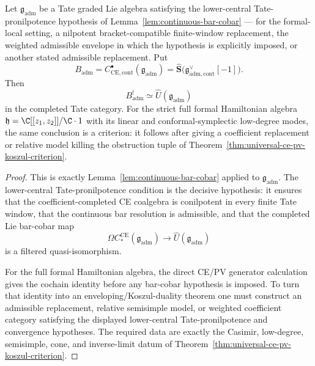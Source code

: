 \documentclass[11pt]{memoir}
\begin{document}
\begin{prop}\label{prop:ce-koszul}
  Let \(\mathfrak g_{\mathrm{adm}}\) be a Tate graded Lie algebra satisfying
  the lower-central Tate-pronilpotence hypothesis of
  Lemma~\ref{lem:continuous-bar-cobar} ---
  for the formal-local setting, a nilpotent
  bracket-compatible finite-window replacement,
  the weighted admissible envelope in which the hypothesis is explicitly
  imposed, or another stated admissible replacement.  Put
  \[
    B_{\mathrm{adm}}
      =C^\bullet_{\mathrm{CE},\mathrm{cont}}(\mathfrak g_{\mathrm{adm}})
      =\widehat{\mathbf S}
       \bigl(\mathfrak g_{\mathrm{adm},\mathrm{cont}}^\vee[-1]\bigr).
  \]
  Then
  \[
    B_{\mathrm{adm}}^!\simeq
    \widehat U(\mathfrak g_{\mathrm{adm}})
  \]
  in the completed Tate category.  For the strict full formal Hamiltonian
  algebra \(\mathfrak h=\C[[z_1,z_2]]/\C\cdot1\) with its linear and
  conformal-symplectic low-degree modes, the same conclusion is a
  criterion: it follows after giving a coefficient replacement or
  relative model killing the obstruction tuple of
  Theorem~\ref{thm:universal-ce-pv-koszul-criterion}.
\end{prop}

\begin{proof}
  This is exactly Lemma~\ref{lem:continuous-bar-cobar} applied to
  \(\mathfrak g_{\mathrm{adm}}\).  The lower-central
  Tate-pronilpotence condition is the decisive hypothesis: it ensures that the coefficient-completed
  CE coalgebra is conilpotent in every finite Tate window, that the
  continuous bar resolution is admissible, and that the completed
  Lie bar-cobar map
  \[
    \Omega C_*^{\mathrm{CE}}(\mathfrak g_{\mathrm{adm}})
      \longrightarrow
    \widehat U(\mathfrak g_{\mathrm{adm}})
  \]
  is a filtered quasi-isomorphism.

  For the full formal Hamiltonian algebra, the direct CE/PV generator
  calculation gives the cochain identity before any bar-cobar hypothesis
  is imposed.  To turn that identity into an enveloping/Koszul-duality
  theorem one must construct an admissible replacement, relative semisimple
  model, or weighted coefficient category satisfying the displayed
  lower-central Tate-pronilpotence and convergence hypotheses.  The
  required data are exactly the Casimir, low-degree, semisimple, cone, and
  inverse-limit datum of
  Theorem~\ref{thm:universal-ce-pv-koszul-criterion}.
\end{proof}
\end{document}
